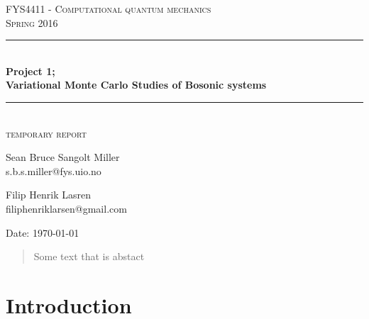\documentclass[english, a4paper]{article}
\begin{document}
\renewcommand{\figurename}{Figure}
\begin{titlepage}
\begin{center}

\textsc{\Large FYS4411 - Computational quantum mechanics }\\[0.5cm]
\textsc{\Large Spring 2016}\\[1.5cm]
\rule{\linewidth}{0.5mm} \\[0.4cm]
{ \huge \bfseries  Project 1;\\ Variational Monte Carlo Studies of Bosonic systems}\\[0.10cm]
\rule{\linewidth}{0.5mm} \\[1.5cm]
\textsc{\Large temporary report}\\[1.5cm]


\begin{minipage}{\textwidth}
\begin{minipage}{0.49\textwidth}
    \begin{center} \large
        Sean Bruce Sangolt Miller\\
        {\footnotesize s.b.s.miller@fys.uio.no}
    \end{center}
\end{minipage}
\quad
\begin{minipage}{0.49\textwidth}
    \begin{center} \large
        Filip Henrik Lasren\\
        {\footnotesize filiphenriklarsen@gmail.com}
    \end{center}
\end{minipage}
\end{minipage}
\vfill

\large{Date: \today}

\end{center}
\end{titlepage}

\begin{abstract}
 Some text that is abstact
\end{abstract}


\tableofcontents
\newpage
{}%


\section{Introduction}
\end{document}
